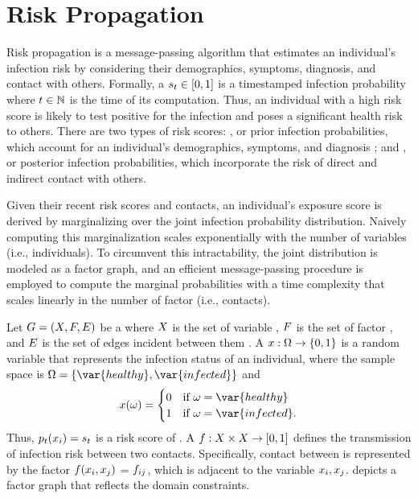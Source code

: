 \chapter{Risk Propagation}\label{ch:risk-propagation}

Risk propagation is a message-passing algorithm that estimates an individual's infection risk by considering their demographics, symptoms, diagnosis, and contact with others. Formally, a  $s_t \in [0, 1]$ is a timestamped infection probability where $t \in \mathbb{N}$ is the time of its computation. Thus, an individual with a high risk score is likely to test positive for the infection and poses a significant health risk to others. There are two types of risk scores: , or prior infection probabilities, which account for an individual's demographics, symptoms, and diagnosis \citep{Menni2020}; and , or posterior infection probabilities, which incorporate the risk of direct and indirect contact with others.

Given their recent risk scores and contacts, an individual's exposure score is derived by marginalizing over the joint infection probability distribution. Naively computing this marginalization scales exponentially with the number of variables (i.e., individuals). To circumvent this intractability, the joint distribution is modeled as a factor graph, and an efficient message-passing procedure is employed to compute the marginal probabilities with a time complexity that scales linearly in the number of factor \verticesName (i.e., contacts).

Let $G = (X, F, E)$ be a  where $X$ is the set of variable \verticesName, $F$ is the set of factor \verticesName, and $E$ is the set of edges incident between them \citep{Kschischang2001}. A  $\vVariable: \eventSpace \rightarrow \{0, 1\} $ is a random variable that represents the infection status of an individual, where the sample space is $\eventSpace = \{\var{healthy}, \var{infected}\}$ and
\begin{equation*}
  \vVariable(\event) =
    \begin{cases}
      0 & \text{if } \event = \var{healthy} \\
      1 & \text{if } \event = \var{infected}.
    \end{cases}
\end{equation*}
Thus, $\pr{\vVariable[i]}[\vTime] = \vScore_\vTime$ is a risk score of . A  $\vFactor: \vVariables \times \vVariables \rightarrow [0, 1]$ defines the transmission of infection risk between two contacts. Specifically, contact between  is represented by the factor \vertexName $\vFactor(\vVariable[i], \vVariable[j])$ = $\vFactor[ij]$, which is adjacent to the variable \verticesName $\vVariable[i], \vVariable[j]$.  depicts a factor graph that reflects the domain constraints.

